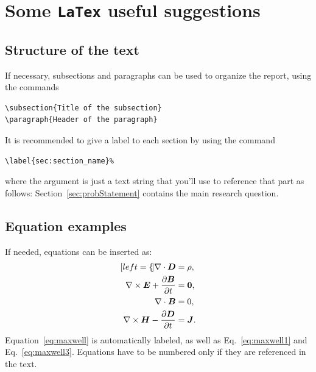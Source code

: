 \documentclass[11pt,a4paper]{article}
\begin{document}



\clearpage
\appendix
\section{Some \texttt{LaTex} useful suggestions}
\subsection{Structure of the text} 
If necessary, subsections and paragraphs can be used to organize the report, using the commands
\begin{verbatim}
\subsection{Title of the subsection}
\paragraph{Header of the paragraph}
\end{verbatim}
It is recommended to give a label to each section by using the command
\begin{verbatim}
\label{sec:section_name}%
\end{verbatim}
where the argument is just a text string that you'll use to reference that part
as follows: Section~\ref{sec:probStatement} contains the main research question.

\subsection{Equation examples}
If needed, equations can be inserted as:
\begin{subequations}
    \label{eq:maxwell}
    \begin{align}[left=\empheqlbrace]
    \nabla\cdot \bm{D} & = \rho, \label{eq:maxwell1} \\
    \nabla \times \bm{E} +  \frac{\partial \bm{B}}{\partial t} & = \bm{0}, \label{eq:maxwell2} \\
    \nabla\cdot \bm{B} & = 0, \label{eq:maxwell3} \\
    \nabla \times \bm{H} - \frac{\partial \bm{D}}{\partial t} &= \bm{J}. \label{eq:maxwell4}
    \end{align}
\end{subequations}
Equation~\eqref{eq:maxwell} is automatically labeled,
as well as Eq.~\eqref{eq:maxwell1} and Eq.~\eqref{eq:maxwell3}.
Equations have to be numbered only if they are referenced in the text.
\end{document}
